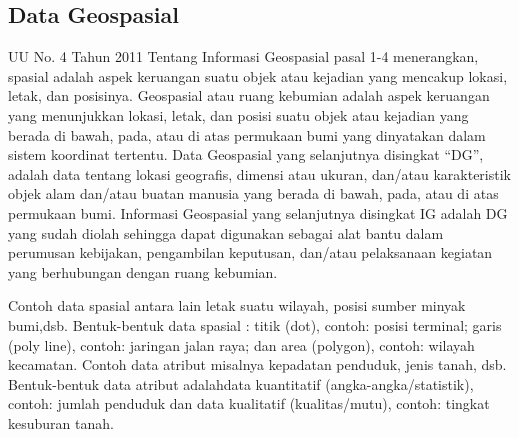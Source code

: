 \subsection{Data Geospasial}
UU No. 4 Tahun 2011 Tentang Informasi Geospasial pasal 1-4 menerangkan, spasial adalah aspek keruangan suatu objek atau  kejadian yang mencakup lokasi, letak, dan posisinya. Geospasial atau ruang kebumian adalah aspek keruangan yang menunjukkan lokasi, letak, dan posisi suatu objek atau kejadian yang berada di bawah, pada, atau di atas permukaan bumi yang dinyatakan dalam sistem koordinat tertentu. Data Geospasial yang selanjutnya disingkat “DG”, adalah data tentang lokasi geografis, dimensi atau ukuran, dan/atau karakteristik objek alam dan/atau buatan manusia yang berada di bawah, pada, atau di atas permukaan bumi. Informasi Geospasial yang selanjutnya disingkat IG adalah DG yang sudah diolah sehingga dapat digunakan sebagai alat bantu dalam perumusan kebijakan, pengambilan keputusan, dan/atau pelaksanaan kegiatan yang berhubungan dengan ruang kebumian.

Contoh data spasial antara lain letak suatu wilayah, posisi sumber minyak bumi,dsb. Bentuk-bentuk data spasial : titik (dot), contoh: posisi terminal; garis (poly line), contoh: jaringan jalan raya; dan area (polygon), contoh: wilayah kecamatan. Contoh data atribut misalnya kepadatan penduduk, jenis tanah, dsb. Bentuk-bentuk data atribut adalahdata kuantitatif (angka-angka/statistik), contoh: jumlah penduduk dan data kualitatif (kualitas/mutu), contoh: tingkat kesuburan tanah.

